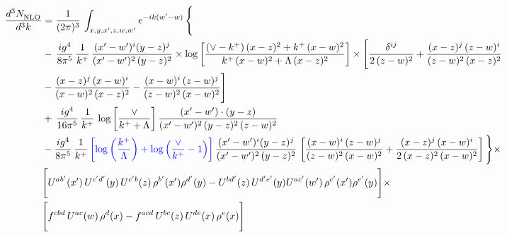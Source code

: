 \documentclass[9pt]{article}
\numberwithin{equation}{section}
\begin{document}
\begin{align}
     \frac{d^{3}N_{\rm NLO}^{\rm}}{d^{3}k}  & =  \frac{1}{(2\pi)^{3}}\, \int_{x,y,x',z,w,w^{\prime}} e^{-ik(w^{\prime}-w)}\, \Bigg\{\notag \\ & -\,\frac{ig^{4}}{8\pi^{5}}\,\frac{1}{k^{+}}\,\frac{(x'-w')^{i}(y-z)^{j}}{(x'-w')^{2}\,(y-z)^{2}}\times \log{\left[\frac{(\vee-k^{+})\,(x-z)^{2}+k^{+}\,(x-w)^{2}}{k^{+}\,(x-w)^{2}+\Lambda\, (x-z)^{2}}\right]}\times \Bigg[\frac{\delta^{ij}}{2\,(z-w)^{2}}+\frac{(x-z)^{j}\,(z-w)^{i}}{(z-w)^{2}\,(x-z)^{2}}\notag \\ & -\frac{(x-z)^{j}\,(x-w)^{i}}{(x-w)^{2}\,(x-z)^{2}}-\frac{(x-w)^{i}\,(z-w)^{j}}{(z-w)^{2}\,(x-w)^{2}}\Bigg]\notag \\ & +\,\frac{ig^{4}}{16\pi^{5}}\,\frac{1}{k^{+}}\,\log{\left[\frac{\vee}{k^{+}+\Lambda}\right]}\, \frac{(x'-w')\cdot (y-z)}{(x'-w')^{2}\,(y-z)^{2}\,(z-w)^{2}}\notag \\ & -\frac{ig^{4}}{8\pi^{5}}\,\frac{1}{k^{+}}\,{\color{blue}\left[\log{\left(\frac{k^{+}}{\Lambda}\right)}+\log{\left(\frac{\vee}{k^{+}}-1\right)}\right]}\,\frac{(x'-w')^{i}(y-z)^{j}}{(x'-w')^{2}\,(y-z)^{2}}\,\left[\frac{(x-w)^{i}\,(z-w)^{j}}{(z-w)^{2}\,(x-w)^{2}}+\frac{(x-z)^{j}\,(x-w)^{i}}{2\,(x-z)^{2}\, (x-w)^{2}}\right]\Bigg\}\times \notag \\ &  \Bigg[U^{ab'}(x')\,U^{c'd'}(y)\,U^{c'b}(z)\,\rho^{b'}(x')\rho^{d'}(y)-U^{bd'}(z)\,U^{d'e'}(y)U^{ac'}(w')\,\rho^{c'}(x')\rho^{e'}(y)\Bigg]\times\notag \\ & \Bigg[f^{cbd}\,U^{ac}(w)\,\rho^{d}(x)-f^{acd}\, U^{bc}(z)\,U^{de}(x)\,\rho^{e}(x)\Bigg] 
\end{align}
\end{document}

